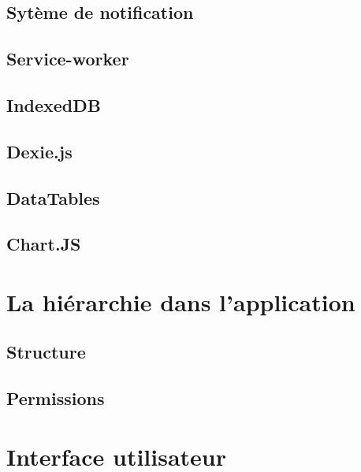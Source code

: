 \documentclass{EPL-master-thesis-covers-FR}
\begin{document}
			
			\subsection{Sytème de notification}	
						

			\subsection*{Service-worker}

		
			\subsection*{IndexedDB}

					

			\subsection*{Dexie.js}
				

			\subsection*{DataTables}

			

			\subsection*{Chart.JS}
				
				

		\section{La hiérarchie dans l'application}


			\subsection*{Structure}

			

			\subsection*{Permissions}

			

		\section{Interface utilisateur}
\end{document}
